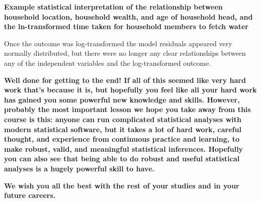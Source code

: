 \documentclass[
]{book}
\begin{document}
\textbf{Example statistical interpretation of the relationship between household location, household wealth, and age of household head, and the ln-transformed time taken for household members to fetch water}

Once the outcome was log-transformed the model residuals appeared very normally distributed, but there were no longer any clear relationships between any of the independent variables and the log-transformed outcome.

\textbf{Well done for getting to the end! If all of this seemed like very hard work that's because it is, but hopefully you feel like all your hard work has gained you some powerful new knowledge and skills. However, probably the most important lesson we hope you take away from this course is this: anyone can run complicated statistical analyses with modern statistical software, but it takes a lot of hard work, careful thought, and experience from continuous practice and learning, to make robust, valid, and meaningful statistical inferences. Hopefully you can also see that being able to do robust and useful statistical analyses is a hugely powerful skill to have.}

\textbf{We wish you all the best with the rest of your studies and in your future careers.}

  
\end{document}
